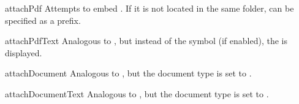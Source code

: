 \documentclass{sopra-base}
\begin{document}
\begin{command}{attachPdf}{}
    Attempts to embed . If it is not located in the same folder,
     can be specified as a prefix. 
\end{command}

\begin{command}{attachPdfText}{}
    Analogous to , but instead of the symbol (if enabled),
    the  is displayed.
\end{command}

\begin{command}{attachDocument}{}
    Analogous to , but the document type is set to . 
\end{command}

\begin{command}{attachDocumentText}{}
    Analogous to , but the document type is set to . 
\end{command}
\end{document}

